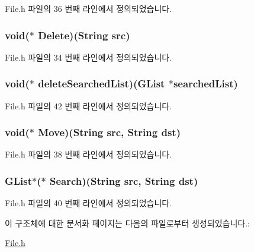 File.\-h 파일의 36 번째 라인에서 정의되었습니다.

\hypertarget{struct___file_a53d84115a9c66fe30c652f908da6d3b7}{
\subsubsection[{Delete}]{\setlength{\rightskip}{0pt plus 5cm}void($\ast$  Delete)({\bf String} src)}}\label{struct___file_a53d84115a9c66fe30c652f908da6d3b7}


File.\-h 파일의 34 번째 라인에서 정의되었습니다.

\hypertarget{struct___file_a688001b808e44b036dac30773decb791}{
\subsubsection[{delete\-Searched\-List}]{\setlength{\rightskip}{0pt plus 5cm}void($\ast$  delete\-Searched\-List)(G\-List $\ast$searched\-List)}}\label{struct___file_a688001b808e44b036dac30773decb791}


File.\-h 파일의 42 번째 라인에서 정의되었습니다.

\hypertarget{struct___file_a7eb122224c5bd93834784151526da9e2}{
\subsubsection[{Move}]{\setlength{\rightskip}{0pt plus 5cm}void($\ast$  Move)({\bf String} src, {\bf String} dst)}}\label{struct___file_a7eb122224c5bd93834784151526da9e2}


File.\-h 파일의 38 번째 라인에서 정의되었습니다.

\hypertarget{struct___file_a4372eaf72ad5ad415c0dc75a3420e1bb}{
\subsubsection[{Search}]{\setlength{\rightskip}{0pt plus 5cm}G\-List$\ast$($\ast$  Search)({\bf String} src, {\bf String} dst)}}\label{struct___file_a4372eaf72ad5ad415c0dc75a3420e1bb}


File.\-h 파일의 40 번째 라인에서 정의되었습니다.



이 구조체에 대한 문서화 페이지는 다음의 파일로부터 생성되었습니다.\-:\begin{DoxyCompactItemize}
\item 
\hyperlink{_file_8h}{File.\-h}\end{DoxyCompactItemize}
